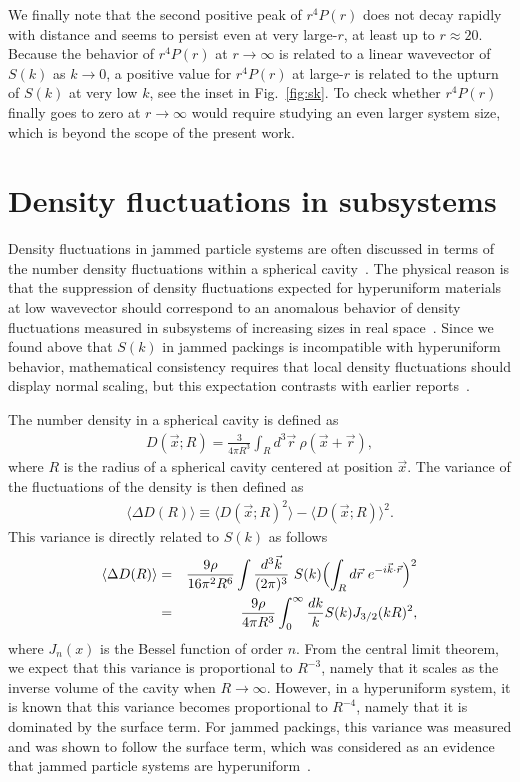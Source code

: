 \documentclass[aps,pre,twocolumn,superscriptaddress]{revtex4-1}
\newcommand{\ave}[1]{\langle {#1} \rangle}
\begin{document}
We finally note that the second positive peak of $r^4 P(r)$ does not 
decay rapidly with distance and seems to persist even at 
very large-$r$, at least up to $r \approx 20$. 
Because the behavior of $r^4 P(r)$ at $r \to \infty$ is related to a
linear wavevector of $S(k)$ as $k \to 0$, 
a positive value for $r^4 P(r)$ at large-$r$ is related 
to the upturn of $S(k)$ at very low $k$, see the inset 
in Fig.~\ref{fig:sk}. 
To check whether $r^4 P(r)$ finally goes to zero at $r \to \infty$
would require studying an even larger system size, 
which is beyond the scope of the present work. 

\section{Density fluctuations in subsystems}
\label{sec:density}

Density fluctuations in jammed particle systems are often discussed 
in terms of the number density fluctuations within a spherical 
cavity~\cite{torquato2003,zachary2009,dreyfus2015,wu2015}. 
The physical reason is that 
the suppression of density fluctuations expected for
hyperuniform materials at low wavevector
should correspond to an anomalous
behavior of density fluctuations measured in subsystems of increasing sizes 
in real space~\cite{torquato2003,zachary2009}. Since we found above 
that $S(k)$ in jammed packings is incompatible with 
hyperuniform behavior, mathematical consistency requires that 
local density fluctuations should display normal scaling, but this 
expectation contrasts with earlier reports~\cite{donev2005,dreyfus2015}.

The number density in a spherical cavity is defined as
\begin{eqnarray}
D (\vec{x};R) = \frac{3}{4 \pi R^3} \int_R d^3\vec{r} \ 
\rho(\vec{x} + \vec{r}), 
\end{eqnarray}
where $R$ is the radius of a spherical cavity centered at position
$\vec{x}$. 
The variance of the fluctuations of the density is then defined  as
\begin{eqnarray}
\ave{\Delta D(R)} \equiv \ave{D (\vec{x};R)^2} - \ave{D (\vec{x};R)}^2. 
\end{eqnarray}
This variance is directly related to $S(k)$ as follows 
\begin{eqnarray}
\ave{\Delta D(R)} 
&=& \frac{9\rho}{16 \pi^2 R^6} \int \frac{d^3\vec{k}}{(2 \pi)^3} \ S(k) 
\Bigl( \int_R d\vec{r} \ e^{-i \vec{k} \cdot \vec{r}} \Bigr)^2 \nonumber \\
&=& \frac{9\rho}{4 \pi R^3} \int^{\infty}_0 \frac{dk}{k} S(k) J_{3/2} (kR)^2,  
\label{numflu}
\end{eqnarray}
where $J_n(x)$ is the Bessel function of order $n$.
From the central limit theorem, 
we expect that this variance is proportional 
to $R^{-3}$, namely that it  scales as the inverse volume of the cavity
when $R \to \infty$. 
However, in a hyperuniform system, 
it is known that this variance becomes proportional to $R^{-4}$, 
namely that it is dominated by the surface term.  
For jammed packings, this variance was measured 
and was shown to follow the surface term, 
which was considered as an evidence that 
jammed particle systems are hyperuniform~\cite{torquato2003,zachary2009}. 
\end{document}
